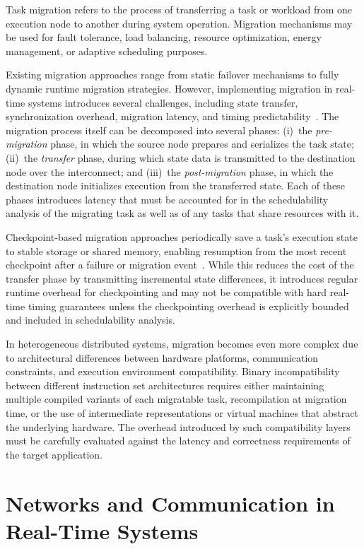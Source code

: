 Task migration refers to the process of transferring a task
or workload from one execution node to another during system
operation. Migration mechanisms may be used for fault
tolerance, load balancing, resource optimization, energy
management, or adaptive scheduling purposes.

Existing migration approaches range from static failover
mechanisms to fully dynamic runtime migration strategies.
However, implementing migration in real-time systems
introduces several challenges, including state transfer,
synchronization overhead, migration latency, and timing
predictability~\cite{chen2012,megel2010}. The migration
process itself can be decomposed into several phases:
(i)~the \emph{pre-migration} phase, in which the source
node prepares and serializes the task state; (ii)~the
\emph{transfer} phase, during which state data is
transmitted to the destination node over the interconnect;
and (iii)~the \emph{post-migration} phase, in which the
destination node initializes execution from the transferred
state. Each of these phases introduces latency that must
be accounted for in the schedulability analysis of the
migrating task as well as of any tasks that share resources
with it.

Checkpoint-based migration approaches periodically save
a task's execution state to stable storage or shared memory,
enabling resumption from the most recent checkpoint after
a failure or migration event~\cite{elnozahy2002}. While
this reduces the cost of the transfer phase by transmitting
incremental state differences, it introduces regular runtime
overhead for checkpointing and may not be compatible with
hard real-time timing guarantees unless the checkpointing
overhead is explicitly bounded and included in schedulability
analysis.

In heterogeneous distributed systems, migration becomes even
more complex due to architectural differences between hardware
platforms, communication constraints, and execution
environment compatibility. Binary incompatibility between
different instruction set architectures requires either
maintaining multiple compiled variants of each migratable
task, recompilation at migration time, or the use of
intermediate representations or virtual machines that
abstract the underlying hardware. The overhead introduced
by such compatibility layers must be carefully evaluated
against the latency and correctness requirements of the
target application.

\section{Networks and Communication in Real-Time Systems}
\label{sec:networks}

